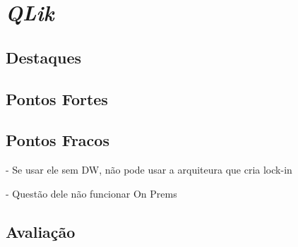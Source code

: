 \section{\emph{QLik}}
\label{sub-qlik}


\subsection*{Destaques}

\subsection*{Pontos Fortes}

\subsection*{Pontos Fracos}


- Se usar ele sem DW, não pode usar a arquiteura que cria lock-in

- Questão dele não funcionar On Prems

\subsection*{Avaliação}

